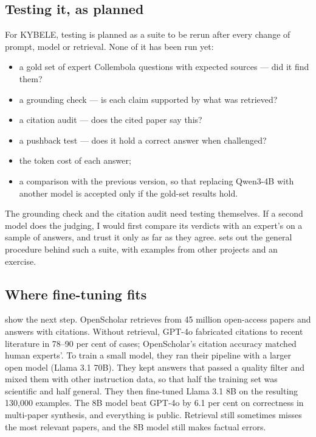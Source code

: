 \subsection{Testing it, as planned}

For KYBELE, testing is planned as a suite to be rerun after every change of
prompt, model or retrieval. None of it has been run yet:

\begin{itemize}
  \item a gold set of expert Collembola questions with expected sources --- did
    it find them?
  \item a grounding check --- is each claim supported by what was retrieved?
  \item a citation audit --- does the cited paper say this?
  \item a pushback test --- does it hold a correct answer when challenged?
  \item the token cost of each answer;
  \item a comparison with the previous version, so that replacing Qwen3-4B with
    another model is accepted only if the gold-set results hold.
\end{itemize}

The grounding check and the citation audit need testing themselves. If a
second model does the judging, I would first compare its verdicts with an
expert's on a sample of answers, and trust it only as far as they agree.
 sets out the general procedure behind such a suite, with
examples from other projects and an exercise.

\subsection{Where fine-tuning fits}

\textcite{asai2026openscholar} show the next step. OpenScholar retrieves from 45
million open-access papers and answers with citations. Without retrieval, GPT-4o
fabricated citations to recent literature in 78--90 per cent of cases;
OpenScholar's citation accuracy matched human experts'. To train a small model,
they ran their pipeline with a larger open model (Llama 3.1 70B).
They kept answers that passed a quality filter and mixed them with other
instruction data, so that half the training set was scientific and half
general. They then fine-tuned Llama 3.1 8B on the
resulting 130{,}000 examples. The 8B model beat GPT-4o by 6.1 per cent on correctness in multi-paper
synthesis, and everything is public. Retrieval still sometimes misses the most
relevant papers, and the 8B model still makes factual errors.

